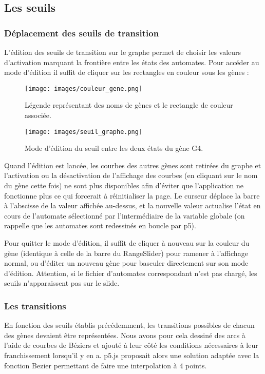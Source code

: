 \bigbreak

\subsection{Les seuils}
\bigbreak
\subsubsection{Déplacement des seuils de transition}
\bigbreak
L’édition des seuils de transition sur le graphe permet de choisir les valeurs d’activation marquant la frontière entre les états des automates.
Pour accéder au mode d’édition il suffit de cliquer sur les rectangles en couleur sous les gènes :

\begin{figure}[!h]
  \texttt{[image: images/couleur\_gene.png]}
  \caption{Légende représentant des noms de gènes et le rectangle de couleur associée.}
\end{figure}

\begin{figure}[!h]
  \texttt{[image: images/seuil\_graphe.png]}
  \caption{Mode d’édition du seuil entre les deux états du gène G4.}
\end{figure}

Quand l’édition est lancée, les courbes des autres gènes sont retirées du graphe et l’activation ou la désactivation de l’affichage des courbes (en cliquant sur le nom du gène cette fois) ne sont plus disponibles afin d’éviter que l’application ne fonctionne plus ce qui forcerait à réinitialiser la page. Le curseur déplace la barre à l’abscisse de la valeur affichée au-dessus, et la nouvelle valeur actualise l’état en cours de l’automate sélectionné par l’intermédiaire de la variable globale (on rappelle que les automates sont redessinés en boucle par p5).

Pour quitter le mode d’édition, il suffit de cliquer à nouveau sur la couleur du gène (identique à celle de la barre du RangeSlider) pour ramener à l’affichage normal, ou d’éditer un nouveau gène pour basculer directement sur son mode d’édition.
Attention, si le fichier d’automates correspondant n’est pas chargé, les seuils n’apparaissent pas sur le slide.

\bigbreak
\subsubsection{Les transitions}
\bigbreak

En fonction des seuils établis précédemment, les transitions possibles de chacun des gènes devaient être représentées. Nous avons pour cela dessiné des arcs à l'aide de courbes de Béziers et ajouté à leur côté les conditions nécessaires à leur franchissement lorsqu'il y en a. p5.js proposait alors une solution adaptée avec la fonction Bezier permettant de faire une interpolation à 4 points. 

